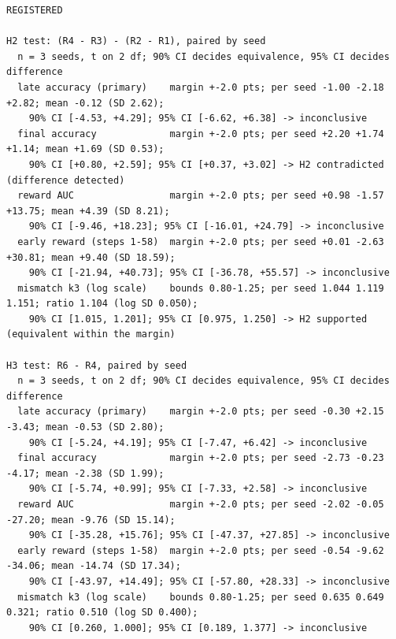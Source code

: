 {\begin{verbatim}
REGISTERED

H2 test: (R4 - R3) - (R2 - R1), paired by seed
  n = 3 seeds, t on 2 df; 90% CI decides equivalence, 95% CI decides difference
  late accuracy (primary)    margin +-2.0 pts; per seed -1.00 -2.18 +2.82; mean -0.12 (SD 2.62);
    90% CI [-4.53, +4.29]; 95% CI [-6.62, +6.38] -> inconclusive
  final accuracy             margin +-2.0 pts; per seed +2.20 +1.74 +1.14; mean +1.69 (SD 0.53);
    90% CI [+0.80, +2.59]; 95% CI [+0.37, +3.02] -> H2 contradicted (difference detected)
  reward AUC                 margin +-2.0 pts; per seed +0.98 -1.57 +13.75; mean +4.39 (SD 8.21);
    90% CI [-9.46, +18.23]; 95% CI [-16.01, +24.79] -> inconclusive
  early reward (steps 1-58)  margin +-2.0 pts; per seed +0.01 -2.63 +30.81; mean +9.40 (SD 18.59);
    90% CI [-21.94, +40.73]; 95% CI [-36.78, +55.57] -> inconclusive
  mismatch k3 (log scale)    bounds 0.80-1.25; per seed 1.044 1.119 1.151; ratio 1.104 (log SD 0.050);
    90% CI [1.015, 1.201]; 95% CI [0.975, 1.250] -> H2 supported (equivalent within the margin)

H3 test: R6 - R4, paired by seed
  n = 3 seeds, t on 2 df; 90% CI decides equivalence, 95% CI decides difference
  late accuracy (primary)    margin +-2.0 pts; per seed -0.30 +2.15 -3.43; mean -0.53 (SD 2.80);
    90% CI [-5.24, +4.19]; 95% CI [-7.47, +6.42] -> inconclusive
  final accuracy             margin +-2.0 pts; per seed -2.73 -0.23 -4.17; mean -2.38 (SD 1.99);
    90% CI [-5.74, +0.99]; 95% CI [-7.33, +2.58] -> inconclusive
  reward AUC                 margin +-2.0 pts; per seed -2.02 -0.05 -27.20; mean -9.76 (SD 15.14);
    90% CI [-35.28, +15.76]; 95% CI [-47.37, +27.85] -> inconclusive
  early reward (steps 1-58)  margin +-2.0 pts; per seed -0.54 -9.62 -34.06; mean -14.74 (SD 17.34);
    90% CI [-43.97, +14.49]; 95% CI [-57.80, +28.33] -> inconclusive
  mismatch k3 (log scale)    bounds 0.80-1.25; per seed 0.635 0.649 0.321; ratio 0.510 (log SD 0.400);
    90% CI [0.260, 1.000]; 95% CI [0.189, 1.377] -> inconclusive
\end{verbatim}}

